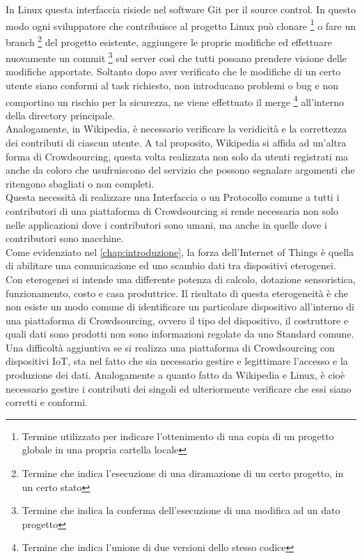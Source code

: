 In Linux questa interfaccia risiede nel software Git per il source control. In questo modo ogni sviluppatore che contribuisce al progetto Linux può clonare \footnote{Termine utilizzato per indicare l'ottenimento di una copia di un progetto globale in una propria cartella locale} o fare un branch \footnote{Termine che indica l'esecuzione di una diramazione di un certo progetto, in un certo stato} del progetto esistente, aggiungere le proprie modifiche ed effettuare nuovamente un commit \footnote{Termine che indica la conferma dell'esecuzione di una modifica ad un dato progetto} sul server così che tutti possano prendere visione delle modifiche apportate. Soltanto dopo aver verificato che le modifiche di un certo utente siano conformi al task richiesto, non introducano problemi o bug e non comportino un rischio per la sicurezza, ne viene effettuato il merge \footnote{Termine che indica l'unione di due versioni dello stesso codice} all'interno della directory principale.\\
Analogamente, in Wikipedia, è necessario verificare la veridicità e la correttezza dei contributi di ciascun utente. A tal proposito, Wikipedia si affida ad un'altra forma di Crowdsourcing, questa volta realizzata non solo da utenti registrati ma anche da coloro che usufruiscono del servizio che possono segnalare argomenti che ritengono sbagliati o non completi.\\
Questa necessità di realizzare una Interfaccia o un Protocollo comune a tutti i contributori di una piattaforma di Crowdsourcing si rende necessaria non solo nelle applicazioni dove i contributori sono umani, ma anche in quelle dove i contributori sono macchine.\\
Come evidenziato nel \autoref{chap:introduzione}, la forza dell'Internet of Things è quella di abilitare una comunicazione ed uno scambio dati tra dispositivi eterogenei. Con eterogenei si intende una differente potenza di calcolo, dotazione sensoristica, funzionamento, costo e casa produttrice. Il risultato di questa eterogeneità è che non esiste un modo comune di identificare un particolare dispositivo all'interno di una piattaforma di Crowdsourcing, ovvero il tipo del dispositivo, il costruttore e quali dati sono prodotti non sono informazioni regolate da uno Standard comune. \cite{famous:paper_crowdsourcing_4} Una difficoltà aggiuntiva se si realizza una piattaforma di Crowdsourcing con dispositivi IoT, sta nel fatto che sia necessario gestire e legittimare l'accesso e la produzione dei dati. Analogamente a quanto fatto da Wikipedia e Linux, è cioè necessario gestire i contributi dei singoli ed ulteriormente verificare che essi siano corretti e conformi.

